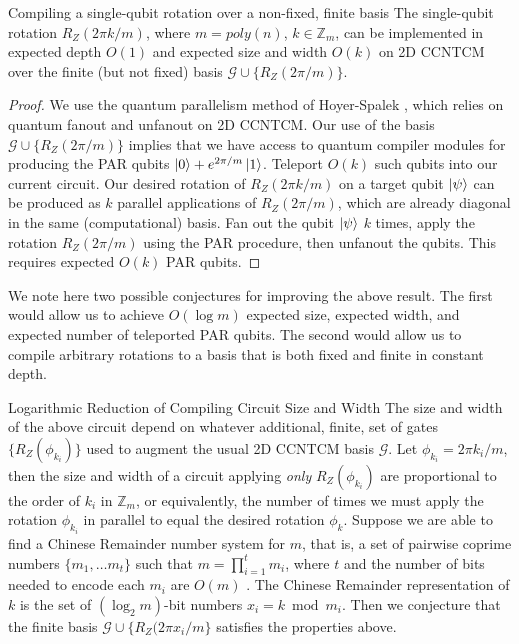 \begin{theorem}{Compiling a single-qubit rotation over a non-fixed, finite basis}
The single-qubit rotation $R_Z(2\pi k /m)$, where $m = poly(n)$,
$k \in \mathbb{Z}_m$,
can be implemented in expected depth $O(1)$ and expected size and width $O(k)$ on
\textsf{2D CCNTCM} over the finite
(but not fixed) basis $\mathcal{G} \cup \{R_Z(2\pi / m)\}$.
\end{theorem}

\begin{proof}
We use the quantum parallelism method of Hoyer-Spalek \cite{Hoyer2002},
which relies on quantum fanout and unfanout on \textsf{2D CCNTCM}.
Our use of the basis $\mathcal{G} \cup \{R_Z(2\pi / m)\}$ implies that
we have access to quantum compiler modules for producing the
PAR qubits $\left\vert{0}\right\rangle + e^{2\pi / m}\left\vert{1}\right\rangle$. Teleport $O(k)$ such qubits
into our current circuit.
Our desired rotation of $R_Z(2\pi k / m)$ on a target qubit $\left\vert{\psi}\right\rangle$
can be produced as $k$
parallel applications of $R_Z(2\pi / m)$, which are already diagonal in
the same (computational) basis. Fan out the qubit $\left\vert{\psi}\right\rangle$ $k$ times,
apply the rotation $R_Z(2\pi /m)$ using the PAR procedure, then unfanout the
qubits.
This requires expected $O(k)$ PAR qubits.
\end{proof}

We note here two possible conjectures for improving the above result.
The first would allow us to achieve $O(\log m)$
expected size, expected width, and
expected number of teleported PAR qubits. The second would allow us to
compile arbitrary rotations to a basis that is both fixed and finite
in constant depth.

\begin{conjecture}{Logarithmic Reduction of Compiling Circuit Size and Width}
The size and width of the above circuit depend on whatever additional,
finite, set of 
gates
$\{ R_Z(\phi_{k_i}) \}$ used to augment the usual \textsf{2D CCNTCM} basis
$\mathcal{G}$. Let $\phi_{k_i} = 2\pi k_i / m$, then the size and width of
a circuit applying \emph{only} $R_Z(\phi_{k_i})$
are proportional to the order of $k_i$ in
$\mathbb{Z}_m$, or equivalently, the number of times we must apply
the rotation $\phi_{k_i}$ in parallel to equal the desired rotation
$\phi_k$. Suppose we are able to find a Chinese Remainder number system
for $m$, that is, a set of pairwise coprime numbers $\{m_1, \ldots m_{t}\}$
such that $m = \prod_{i=1}^t m_i $, where $t$ and the number of bits
needed to encode each $m_i$ are $O(m)$ \cite{Yeh1996}.
The Chinese Remainder representation of $k$
is the set of $(\log_2 m)$-bit numbers
$x_i = k \bmod m_i$. 
Then we conjecture that
the finite basis $\mathcal{G} \cup \{R_Z(2\pi x_i / m\}$ satisfies the
properties above.
\end{conjecture}

